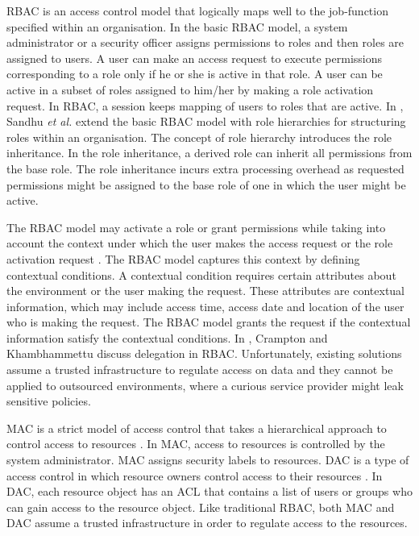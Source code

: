\documentclass[epsfig,a4paper,11pt,titlepage]{book}
\numberwithin{algorithm}{chapter}
\begin{document}
\gls{RBAC} \cite{Sandhu:1996} is an access control model that logically maps well to the job-function specified within an organisation. In the basic \gls{RBAC} model, a system administrator or a security officer assigns permissions to roles and then roles are assigned to users. A user can make an access request to execute permissions corresponding to a role only if he or she is active in that role. A user can be active in a subset of roles assigned to him/her by making a role activation request. In \gls{RBAC}, a session keeps mapping of users to roles that are active. In \cite{Sandhu:1996}, Sandhu \emph{et al.} extend the basic \gls{RBAC} model with role hierarchies for structuring roles within an organisation. The concept of role hierarchy introduces the role inheritance. In the role inheritance, a derived role can inherit all permissions from the base role. The role inheritance incurs extra processing overhead as requested permissions might be assigned to the base role of one in which the user might be active. 

The \gls{RBAC} model may activate a role or grant permissions while taking into account the context under which the user makes the access request or the role activation request \cite{Joshi:2008, Kim:2007, Joshi:2005, Strembeck:2004, Neumann:2003, Bertino:2001, Lupu:1997}. The \gls{RBAC} model captures this context by defining contextual conditions. A contextual condition requires certain attributes about the environment or the user making the request. These attributes are contextual information, which may include access time, access date and location of the user who is making the request. The \gls{RBAC} model grants the request if the contextual information satisfy the contextual conditions. In \cite{Crampton:2008}, Crampton and Khambhammettu discuss delegation in \gls{RBAC}. Unfortunately, existing solutions \cite{Crampton:2008, Joshi:2008, Kim:2007, Joshi:2005, Strembeck:2004, Neumann:2003, Bertino:2001, Lupu:1997, Sandhu:1996} assume a trusted infrastructure to regulate access on data and they cannot be applied to outsourced environments, where a curious service provider might leak sensitive policies.

\gls{MAC} is a strict model of access control that takes a hierarchical approach to control access to resources \cite{Vimercati:2011:MAC}. In \gls{MAC}, access to resources is controlled by the system administrator. \gls{MAC} assigns security labels to resources. \gls{DAC} is a type of access control in which resource owners control access to their resources \cite{Vimercati:2011:DAC}. In \gls{DAC}, each resource object has an \gls{ACL} that contains a list of users or groups who can gain access to the resource object. Like traditional \gls{RBAC}, both \gls{MAC} and \gls{DAC} assume a trusted infrastructure in order to regulate access to the resources.
\end{document}

